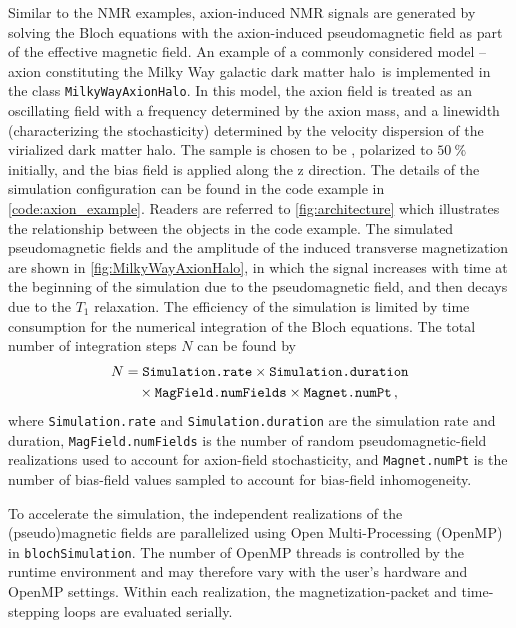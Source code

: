 Similar to the NMR examples, axion-induced NMR signals are generated by solving the Bloch equations with the axion-induced pseudomagnetic field as part of the effective magnetic field. 
An example of a commonly considered model -- axion constituting the Milky Way galactic dark matter halo\,\cite{Evans2019_SHMRefined,Gramolin2022Feb_SpectralSignatures} is implemented in the class \texttt{MilkyWayAxionHalo}. 
In this model, the axion field is treated as an oscillating field with a frequency determined by the axion mass, and a linewidth (characterizing the stochasticity) determined by the velocity dispersion of the virialized dark matter halo. 
The sample is chosen to be , polarized to $\SI{50}{\percent}$ initially, and the bias field is applied along the z direction. 
The details of the simulation configuration can be found in the code example in \cref{code:axion_example}. 
Readers are referred to \cref{fig:architecture} which illustrates the relationship between the objects in the code example. 
The simulated pseudomagnetic fields and the amplitude of the induced transverse magnetization are shown in \cref{fig:MilkyWayAxionHalo}, in which the signal increases with time at the beginning of the simulation due to the pseudomagnetic field, and then decays due to the $T_1$ relaxation. 
The efficiency of the simulation is limited by time consumption for the numerical integration of the Bloch equations. 
The total number of integration steps $N$ can be found by
\begin{align}
    N &= \text{\texttt{Simulation.rate}} \times \text{\texttt{Simulation.duration}} \nonumber\\
    &\quad \times \text{\texttt{MagField.numFields}} \times \text{\texttt{Magnet.numPt}}\,,
\end{align}
where \texttt{Simulation.rate} and \texttt{Simulation.duration} are the simulation rate and duration, \texttt{MagField.numFields} is the number of random pseudomagnetic-field realizations used to account for axion-field stochasticity, and \texttt{Magnet.numPt} is the number of bias-field values sampled to account for bias-field inhomogeneity. 

To accelerate the simulation, the independent realizations of the (pseudo)magnetic fields are parallelized using Open Multi-Processing (OpenMP)\,\cite{OpenMP2024} in \texttt{blochSimulation}.
The number of OpenMP threads is controlled by the runtime environment and may therefore vary with the user's hardware and OpenMP settings.
Within each realization, the magnetization-packet and time-stepping loops are evaluated serially. 

